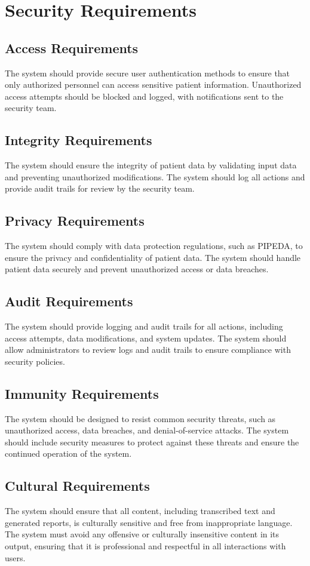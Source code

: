 \documentclass[12pt]{article}
\begin{document}
\section{Security Requirements}
\subsection{Access Requirements}
The system should provide secure user authentication methods to ensure that only authorized personnel can access sensitive patient information. Unauthorized access attempts should be blocked and logged, with notifications sent to the security team.

\subsection{Integrity Requirements}
The system should ensure the integrity of patient data by validating input data and preventing unauthorized modifications. The system should log all actions and provide audit trails for review by the security team.

\subsection{Privacy Requirements}
The system should comply with data protection regulations, such as PIPEDA, to ensure the privacy and confidentiality of patient data. The system should handle patient data securely and prevent unauthorized access or data breaches.

\subsection{Audit Requirements}
The system should provide logging and audit trails for all actions, including access attempts, data modifications, and system updates. The system should allow administrators to review logs and audit trails to ensure compliance with security policies.

\subsection{Immunity Requirements}
The system should be designed to resist common security threats, such as unauthorized access, data breaches, and denial-of-service attacks. The system should include security measures to protect against these threats and ensure the continued operation of the system.

\subsection{Cultural Requirements}
The system should ensure that all content, including transcribed text and generated reports, is culturally sensitive and free from inappropriate language. The system must avoid any offensive or culturally insensitive content in its output, ensuring that it is professional and respectful in all interactions with users.
\end{document}
